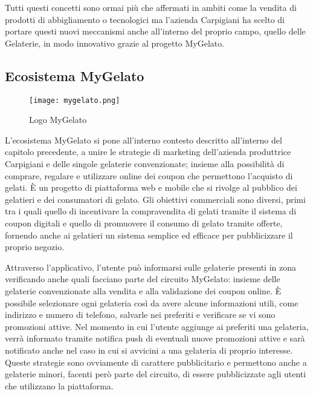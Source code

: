 Tutti questi concetti sono ormai più che affermati in ambiti come la vendita di prodotti di abbigliamento o tecnologici ma l'azienda Carpigiani ha scelto di portare questi nuovi meccanismi anche all'interno del proprio campo, quello delle Gelaterie, in modo innovativo grazie al progetto MyGelato.

\subsection{Ecosistema MyGelato}

\begin{figure}[h!]
  \begin{center} 
  \texttt{[image: mygelato.png]}
  \caption{Logo MyGelato}
  \label{fig:appEconomy1}
  \end{center}
\end{figure}

L'ecosistema MyGelato si pone all'interno contesto descritto all'interno del capitolo precedente, a unire le strategie di marketing dell'azienda produttrice Carpigiani e delle singole gelaterie convenzionate; insieme alla possibilità di comprare, regalare e utilizzare online dei coupon che permettono l'acquisto di gelati.
È un progetto di piattaforma web e mobile che si rivolge al pubblico dei gelatieri e dei consumatori di gelato. Gli obiettivi commerciali sono diversi, primi tra i quali quello di incentivare la compravendita di gelati tramite il sistema di coupon digitali e quello di promuovere il consumo di gelato tramite offerte, fornendo anche ai gelatieri un sistema semplice ed efficace per pubblicizzare il proprio negozio.

Attraverso l'applicativo, l'utente può informarsi sulle gelaterie presenti in zona verificando anche quali facciano parte del circuito MyGelato: insieme delle gelaterie convenzionate alla vendita e alla validazione dei coupon online.
È possibile selezionare ogni gelateria così da avere alcune informazioni utili, come indirizzo e numero di telefono, salvarle nei preferiti e verificare se vi sono promozioni attive.
Nel momento in cui l'utente aggiunge ai preferiti una gelateria, verrà informato tramite notifica push di eventuali nuove promozioni attive e sarà notificato anche nel caso in cui si avvicini a una gelateria di proprio interesse.
Queste strategie sono ovviamente di carattere pubblicitario e permettono anche a gelaterie minori, facenti però parte del circuito, di essere pubblicizzate agli utenti che utilizzano la piattaforma.

